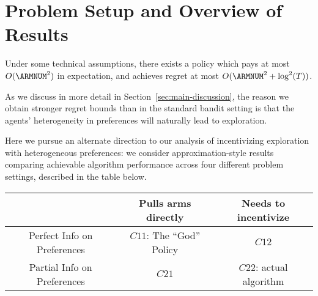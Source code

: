 \section{Problem Setup and Overview of Results}


\begin{theorem} \label{thm:main-intro}
Under some technical assumptions, 
there exists a policy which pays at most $O(\ARMNUM^2)$ in expectation,
and achieves regret at most $O(\ARMNUM^2 + \log^2(T))$.
\end{theorem}


As we discuss in more detail in Section~\ref{sec:main-discussion},
the reason we obtain stronger regret bounds than in the standard bandit
setting is that the agents' heterogeneity in preferences will
naturally lead to exploration.

Here we pursue an alternate direction to our analysis of incentivizing exploration with heterogeneous preferences: we consider approximation-style results comparing achievable algorithm performance across four different problem settings, described in the table below.

\begin{center}
\begin{tabular}{ c|c|c| } 
 \hline
     & Pulls arms directly & Needs to incentivize \\ 
\hline
 Perfect Info on Preferences & $C11$: The ``God'' Policy & $C12$ \\ 
 Partial Info on Preferences & $C21$ & $C22$: actual algorithm \\ 
 \hline
\end{tabular}
\end{center}

